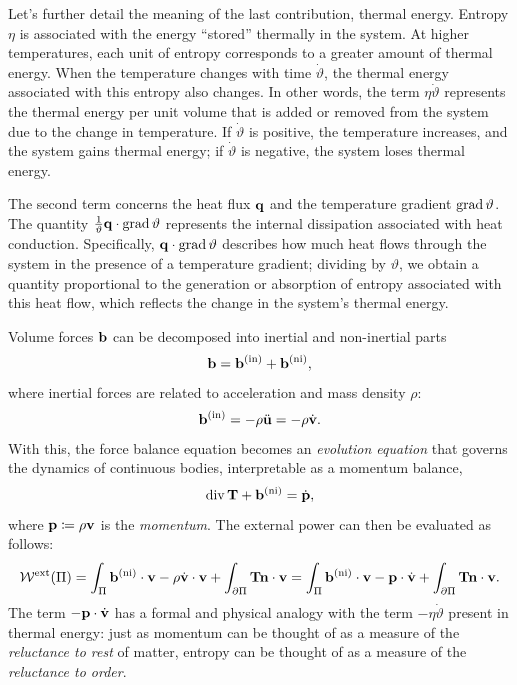 Let’s further detail the meaning of the last contribution, thermal energy. Entropy $\eta$ is associated with the energy ``stored'' thermally in the system. At higher temperatures, each unit of entropy corresponds to a greater amount of thermal energy. When the temperature changes with time $\dot{\vartheta}$, the thermal energy associated with this entropy also changes. In other words, the term $\eta\dot{\vartheta}$ represents the thermal energy per unit volume that is added or removed from the system due to the change in temperature. If $\dot{\vartheta}$ is positive, the temperature increases, and the system gains thermal energy; if $\dot{\vartheta}$ is negative, the system loses thermal energy.

The second term concerns the heat flux $\mathbf{q}$ and the temperature gradient $\operatorname{grad}\vartheta$. The quantity $\frac{1}{\vartheta}\mathbf{q} \cdot \operatorname{grad}\vartheta$ represents the internal dissipation associated with heat conduction. Specifically, $\mathbf{q} \cdot \operatorname{grad}\vartheta$ describes how much heat flows through the system in the presence of a temperature gradient; dividing by $\vartheta$, we obtain a quantity proportional to the generation or absorption of entropy associated with this heat flow, which reflects the change in the system's thermal energy.

\begin{remark}\label{bb}
	Volume forces $\mathbf{b}$ can be decomposed into inertial and non-inertial parts
	\begin{equation}
		\mathbf{b} =\mathbf{b}^{({\rm in})}+\mathbf{b}^{({\rm ni})},
	\end{equation}
	where inertial forces are related to acceleration and mass density $\rho$:
	\begin{equation}
		\mathbf{b}^{({\rm in})}=-\rho \ddot{\mathbf{u}}=-\rho \dot{\mathbf{v}}.
	\end{equation}
	With this, the force balance equation becomes an \textit{evolution equation} that governs the dynamics of continuous bodies, interpretable as a momentum balance,
	\begin{equation}
		\operatorname{div} \mathbf{T}+\mathbf{b}^{({\rm ni})}=\dot{\mathbf{p}},
	\end{equation}
	where $\mathbf{p}\coloneqq\rho \mathbf{v}$ is the \textit{momentum}. The external power can then be evaluated as follows:
	\begin{equation}
		\mathcal{W}^{\rm ext}(\Pi)= \int_{\Pi} \mathbf{b}^{({\rm ni})} \cdot \mathbf{v}-\rho \dot{\mathbf{v}} \cdot \mathbf{v} + \int_{\partial \Pi} \mathbf{T}\mathbf{n}\cdot \mathbf{v}=\int_{\Pi} \mathbf{b}^{({\rm ni})} \cdot \mathbf{v}-\mathbf{p} \cdot \dot{\mathbf{v}} + \int_{\partial \Pi} \mathbf{T}\mathbf{n}\cdot \mathbf{v}.
	\end{equation}
	The term $-\mathbf{p} \cdot \dot{\mathbf{v}}$ has a formal and physical analogy with the term $-\eta \dot{\vartheta}$ present in thermal energy: just as momentum can be thought of as a measure of the \textit{reluctance to rest} of matter, entropy can be thought of as a measure of the \textit{reluctance to order}.
\end{remark}

